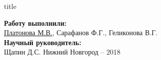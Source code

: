 
  

\begin{frame}[plain]
	\centering
	\vspace{2cm}
	\begin{beamercolorbox}[sep=8pt,center]{title}
		\bf{}\inserttitle
	\end{beamercolorbox}
	\vspace{0.5cm}
	\normalsize \textbf{Работу выполнили:}\\
	\large
	\underline{Платонова М.В.}, %
	Сарафанов Ф.Г., %
	Геликонова В.Г. %
	\\ 
	\vspace{0.5cm}
	\normalsize{\textbf{Научный руководитель:}\\}
	\large{Щапин Д.С.}
	\vfill
	\small{Нижний Новгород -- 2018}
\end{frame}

